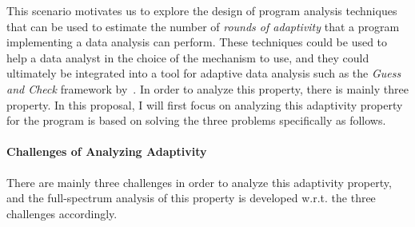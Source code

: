 This scenario motivates us to explore the design of program analysis techniques that can be used to estimate the number of \emph{rounds of adaptivity} that a program implementing a data analysis can perform. These techniques could be used to help a data analyst in the choice of the mechanism to use,
and they
could ultimately be integrated into a tool for adaptive data analysis such as the \emph{Guess and Check} framework by~\cite{RogersRSSTW20}. 
%
In order to analyze this property, there is mainly three property. 
In this proposal, I will first focus on analyzing 
this adaptivity property for the program is based on solving the three problems specifically as follows.

\paragraph{Challenges of Analyzing Adaptivity}
\label{sec:intro-challenge}
There are mainly three challenges in order to analyze this adaptivity property, 
and the full-spectrum analysis of this property is 
developed w.r.t. the three challenges accordingly.


